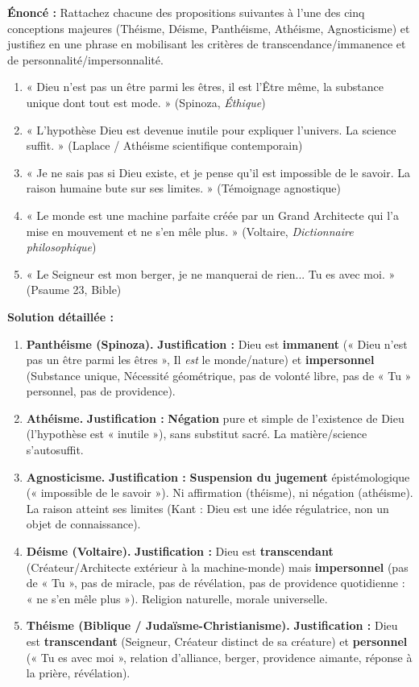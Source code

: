 \documentclass[11pt]{article}
\begin{document}
\begin{exoresolu}
\textbf{Énoncé :} Rattachez chacune des propositions suivantes à l'une des cinq conceptions majeures (Théisme, Déisme, Panthéisme, Athéisme, Agnosticisme) et justifiez en une phrase en mobilisant les critères de transcendance/immanence et de personnalité/impersonnalité.
\begin{enumerate}
    \item « Dieu n'est pas un être parmi les êtres, il est l'Être même, la substance unique dont tout est mode. » (Spinoza, \emph{Éthique})
    \item « L'hypothèse Dieu est devenue inutile pour expliquer l'univers. La science suffit. » (Laplace / Athéisme scientifique contemporain)
    \item « Je ne sais pas si Dieu existe, et je pense qu'il est impossible de le savoir. La raison humaine bute sur ses limites. » (Témoignage agnostique)
    \item « Le monde est une machine parfaite créée par un Grand Architecte qui l'a mise en mouvement et ne s'en mêle plus. » (Voltaire, \emph{Dictionnaire philosophique})
    \item « Le Seigneur est mon berger, je ne manquerai de rien... Tu es avec moi. » (Psaume 23, Bible)
\end{enumerate}

\tcblower
\textbf{Solution détaillée :}

\begin{enumerate}
    \item \textbf{Panthéisme (Spinoza).} \textbf{Justification :} Dieu est \textbf{immanent} (« Dieu n'est pas un être parmi les êtres », Il \emph{est} le monde/nature) et \textbf{impersonnel} (Substance unique, Nécessité géométrique, pas de volonté libre, pas de « Tu » personnel, pas de providence).
    \item \textbf{Athéisme.} \textbf{Justification :} \textbf{Négation} pure et simple de l'existence de Dieu (l'hypothèse est « inutile »), sans substitut sacré. La matière/science s'autosuffit.
    \item \textbf{Agnosticisme.} \textbf{Justification :} \textbf{Suspension du jugement} épistémologique (« impossible de le savoir »). Ni affirmation (théisme), ni négation (athéisme). La raison atteint ses limites (Kant : Dieu est une idée régulatrice, non un objet de connaissance).
    \item \textbf{Déisme (Voltaire).} \textbf{Justification :} Dieu est \textbf{transcendant} (Créateur/Architecte extérieur à la machine-monde) mais \textbf{impersonnel} (pas de « Tu », pas de miracle, pas de révélation, pas de providence quotidienne : « ne s'en mêle plus »). Religion naturelle, morale universelle.
    \item \textbf{Théisme (Biblique / Judaïsme-Christianisme).} \textbf{Justification :} Dieu est \textbf{transcendant} (Seigneur, Créateur distinct de sa créature) et \textbf{personnel} (« Tu es avec moi », relation d'alliance, berger, providence aimante, réponse à la prière, révélation).
\end{enumerate}


\end{exoresolu}
\end{document}
